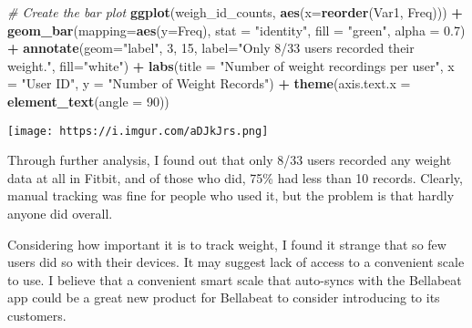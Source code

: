 \documentclass[
]{article}
\newenvironment{Shaded}{\begin{snugshade}}{\end{snugshade}}
\newcommand{\AttributeTok}[1]{\textcolor[rgb]{0.13,0.29,0.53}{#1}}
\newcommand{\CommentTok}[1]{\textcolor[rgb]{0.56,0.35,0.01}{\textit{#1}}}
\newcommand{\DecValTok}[1]{\textcolor[rgb]{0.00,0.00,0.81}{#1}}
\newcommand{\FloatTok}[1]{\textcolor[rgb]{0.00,0.00,0.81}{#1}}
\newcommand{\FunctionTok}[1]{\textcolor[rgb]{0.13,0.29,0.53}{\textbf{#1}}}
\newcommand{\NormalTok}[1]{#1}
\newcommand{\OtherTok}[1]{\textcolor[rgb]{0.56,0.35,0.01}{#1}}
\newcommand{\SpecialCharTok}[1]{\textcolor[rgb]{0.81,0.36,0.00}{\textbf{#1}}}
\newcommand{\StringTok}[1]{\textcolor[rgb]{0.31,0.60,0.02}{#1}}
\begin{document}
\begin{Shaded}
\end{Shaded}

\begin{Shaded}
\begin{Highlighting}[]
\CommentTok{\# Create the bar plot}
\FunctionTok{ggplot}\NormalTok{(weigh\_id\_counts, }\FunctionTok{aes}\NormalTok{(}\AttributeTok{x=}\FunctionTok{reorder}\NormalTok{(Var1, Freq))) }\SpecialCharTok{+}
  \FunctionTok{geom\_bar}\NormalTok{(}\AttributeTok{mapping=}\FunctionTok{aes}\NormalTok{(}\AttributeTok{y=}\NormalTok{Freq), }\AttributeTok{stat =} \StringTok{"identity"}\NormalTok{, }\AttributeTok{fill =} \StringTok{"green"}\NormalTok{, }\AttributeTok{alpha =} \FloatTok{0.7}\NormalTok{) }\SpecialCharTok{+} 
  \FunctionTok{annotate}\NormalTok{(}\AttributeTok{geom=}\StringTok{"label"}\NormalTok{, }\DecValTok{3}\NormalTok{, }\DecValTok{15}\NormalTok{, }\AttributeTok{label=}\StringTok{"Only 8/33 users recorded their weight."}\NormalTok{, }\AttributeTok{fill=}\StringTok{"white"}\NormalTok{) }\SpecialCharTok{+}
  \FunctionTok{labs}\NormalTok{(}\AttributeTok{title =} \StringTok{"Number of weight recordings per user"}\NormalTok{,}
       \AttributeTok{x =} \StringTok{"User ID"}\NormalTok{,}
       \AttributeTok{y =} \StringTok{"Number of Weight Records"}\NormalTok{) }\SpecialCharTok{+}
  \FunctionTok{theme}\NormalTok{(}\AttributeTok{axis.text.x =} \FunctionTok{element\_text}\NormalTok{(}\AttributeTok{angle =} \DecValTok{90}\NormalTok{))}
\end{Highlighting}
\end{Shaded}

\texttt{[image: https://i.imgur.com/aDJkJrs.png]}

Through further analysis, I found out that only 8/33 users recorded any
weight data at all in Fitbit, and of those who did, 75\% had less than
10 records. Clearly, manual tracking was fine for people who used it,
but the problem is that hardly anyone did overall.

Considering how important it is to track weight, I found it strange that
so few users did so with their devices. It may suggest lack of access to
a convenient scale to use. {I believe that a convenient smart scale that
auto-syncs with the Bellabeat app could be a great new product for
Bellabeat to consider introducing to its customers.}
\end{document}
